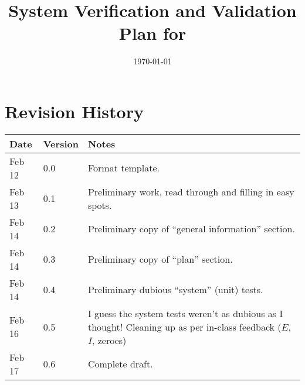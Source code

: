 \documentclass[12pt, titlepage]{article}
\begin{document}

\title{System Verification and Validation Plan for \progname{}}
\author{\authname}
\date{\today}

\maketitle



\section{Revision History}

\begin{tabularx}{\textwidth}{p{3cm}p{2cm}X} \toprule {
    \bf Date} & {\bf Version} & {\bf Notes}                                               \\
    \midrule
    Feb 12    & 0.0           & Format template.                                          \\
    Feb 13    & 0.1           & Preliminary work, read through and filling in easy spots. \\
    Feb 14    & 0.2           & Preliminary copy of ``general information'' section.      \\
    Feb 14    & 0.3           & Preliminary copy of ``plan'' section.                     \\
    Feb 14    & 0.4           & Preliminary dubious ``system'' (unit) tests.              \\
    Feb 16    & 0.5           & I guess the system tests weren't as dubious as I thought! Cleaning up as per in-class feedback ($E$, $I$, zeroes) \\
    Feb 17    & 0.6           & Complete draft.                                           \\
    \bottomrule
\end{tabularx}

\newpage
\end{document}
